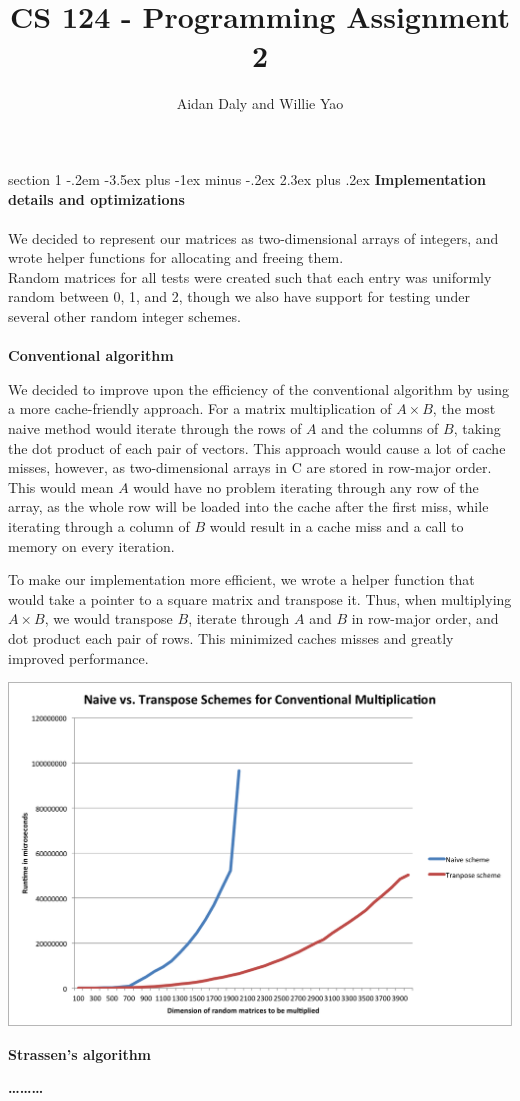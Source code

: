 \documentclass[12pt]{article}
\title{CS 124 - Programming Assignment 2}
\author{Aidan Daly and Willie Yao}
\makeatletter
\newenvironment{problem}{\@startsection
       {section}
       {1}
       {-.2em}
       {-3.5ex plus -1ex minus -.2ex}
       {2.3ex plus .2ex}
       {\pagebreak[3]%
       \large\bf\noindent{Problem }
       }
       }
       {%
       \begin{center}\large\bf \ldots\ldots\ldots\end{center}}
\makeatother
\begin{document}
\maketitle

\begin{problem}{}
\textbf{Implementation details and optimizations}\\
\\
We decided to represent our matrices as two-dimensional arrays of integers, and wrote helper functions for allocating and freeing them. \\
Random matrices for all tests were created such that each entry was uniformly random between 0, 1, and 2, though we also have support for testing under several other random integer schemes.\\
\\
\textbf{Conventional algorithm}

We decided to improve upon the efficiency of the conventional algorithm by using a more cache-friendly approach.  For a matrix multiplication of $A \times B$, the most naive method would iterate through the rows of $A$ and the columns of $B$, taking the dot product of each pair of vectors.  This approach would cause a lot of cache misses, however, as two-dimensional arrays in C are stored in row-major order.  This would mean $A$ would have no problem iterating through any row of the array, as the whole row will be loaded into the cache after the first miss, while iterating through a column of $B$ would result in a cache miss and a call to memory on every iteration.

To make our implementation more efficient, we wrote a helper function that would take a pointer to a square matrix and transpose it.  Thus, when multiplying $A \times B$, we would transpose $B$, iterate through $A$ and $B$ in row-major order, and dot product each pair of rows.  This minimized caches misses and greatly improved performance.
\begin{center}
\includegraphics[scale=.65]{figs/conventional.png}
\end{center}
\textbf{Strassen's algorithm}


\end{problem}
\end{document}
